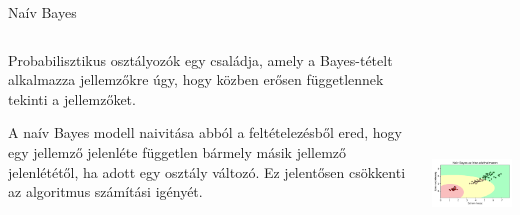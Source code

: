 \documentclass[english, aspectratio=169]{beamer}
\begin{document}
\begin{frame}{Naív Bayes}
\begin{columns}
\begin{column}{.5\textwidth}
Probabilisztikus osztályozók egy családja, amely a Bayes-tételt alkalmazza jellemzőkre úgy, hogy közben erősen függetlennek tekinti a jellemzőket.\par\medskip
A naív Bayes modell naivitása abból a feltételezésből ered, hogy egy jellemző jelenléte független bármely másik jellemző jelenlététől, ha adott egy osztály változó. Ez jelentősen csökkenti az algoritmus számítási igényét. 
\end{column}
\begin{column}{.5\textwidth}
\begin{center}
\includegraphics[width=7cm, height=7cm, keepaspectratio]{images/generative_3.png}
\end{center}
\end{column}
\end{columns}
\end{frame}
\end{document}
